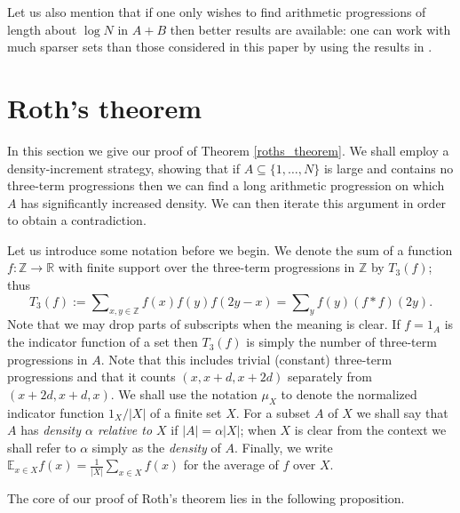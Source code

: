 \documentclass[12pt,a4paper,reqno]{amsart}
\numberwithin{equation}{section}
\theoremstyle{plain}
\theoremstyle{definition}
\renewcommand{\subset}{\subseteq}
\def\E{\mathbb{E}}
\def\Z{\mathbb{Z}}
\def\R{\mathbb{R}}
\DeclareMathOperator{\ssum}{\textstyle{\sum\nolimits}}
\begin{document}
Let us also mention that if one only wishes to find arithmetic progressions of length about $\log N$ in $A+B$ then better results are available: one can work with much sparser sets than those considered in this paper by using the results in \cite{croot-ruzsa-schoen}.

\section{Roth's theorem}\label{roth}
In this section we give our proof of Theorem \ref{roths_theorem}. We shall employ a density-increment strategy, showing that if $A \subset \{1,\ldots,N\}$ is large and contains no three-term progressions then we can find a long arithmetic progression on which $A$ has significantly increased density. We can then iterate this argument in order to obtain a contradiction.

Let us introduce some notation before we begin. We denote the sum of a function $f : \Z \to \R$ with finite support over the three-term progressions in $\Z$ by $T_3(f)$; thus
\[ T_3(f) := \ssum_{x,y \in \Z} f(x)f(y)f(2y-x) = \ssum_{y} f(y)(f*f)(2y). \]
Note that we may drop parts of subscripts when the meaning is clear. If $f = 1_A$ is the indicator function of a set then $T_3(f)$ is simply the number of three-term progressions in $A$. Note that this includes trivial (constant) three-term progressions and that it counts $(x, x+d, x+2d)$ separately from $(x+2d, x+d, x)$. We shall use the notation $\mu_X$ to denote the normalized indicator function $1_X/|X|$ of a finite set $X$. For a subset $A$ of $X$ we shall say that $A$ has \emph{density $\alpha$ relative to $X$} if $|A| = \alpha |X|$; when $X$ is clear from the context we shall refer to $\alpha$ simply as the \emph{density} of $A$. Finally, we write $\E_{x \in X} f(x) = \frac{1}{|X|} \sum_{x \in X} f(x)$ for the average of $f$ over $X$.

The core of our proof of Roth's theorem lies in the following proposition.
\end{document}

